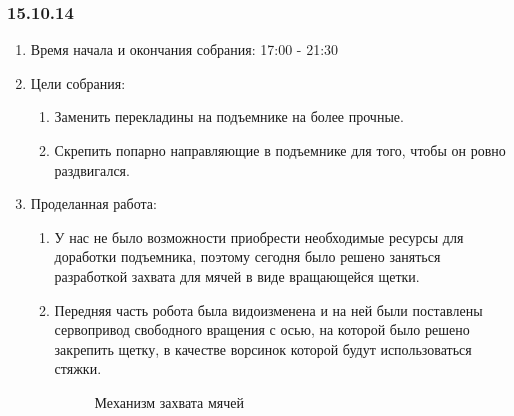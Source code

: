 
\subsubsection{15.10.14}

\begin{enumerate}
	\item Время начала и окончания собрания:
	17:00 - 21:30
	\item Цели собрания:
	\begin{enumerate}
	  \item Заменить перекладины на подъемнике на более прочные.
	  
	  \item Скрепить попарно направляющие в подъемнике для того, чтобы он ровно раздвигался.
	  
    \end{enumerate}
    
	\item Проделанная работа:
	\begin{enumerate}
	  \item У нас не было возможности приобрести необходимые ресурсы для доработки подъемника, поэтому сегодня было решено заняться разработкой захвата для мячей в виде вращающейся щетки.
      
      \item  Передняя часть робота была видоизменена и на ней были поставлены сервопривод свободного вращения с осью, на которой было решено закрепить щетку, в качестве ворсинок которой будут использоваться стяжки.
      
     \begin{figure}[H]
     	\begin{minipage}[h]{1\linewidth}
     		\caption{Механизм захвата мячей}
     	\end{minipage}
     \end{figure}
      

\end{enumerate}
\end{enumerate}
